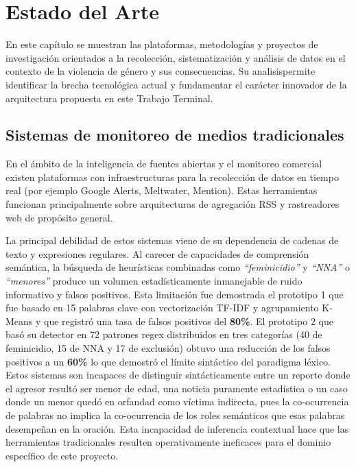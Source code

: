 

\chapter{Estado del Arte}
\label{cap:estadoarte}

En este capítulo se muestran las plataformas, metodologías y proyectos de investigación orientados a la recolección,
sistematización y análisis de datos en el contexto de la violencia de género y sus consecuencias. Su analisispermite identificar la
brecha tecnológica actual y fundamentar el carácter innovador de la arquitectura propuesta en este Trabajo Terminal.
 
\section{Sistemas de monitoreo de medios tradicionales}
\label{sec:ea_monitoreo_tradicional}

En el ámbito de la inteligencia de fuentes abiertas y el monitoreo comercial
existen plataformas con infraestructuras para la recolección de datos en tiempo real (por ejemplo
Google Alerts, Meltwater, Mention). Estas herramientas funcionan principalmente sobre arquitecturas
de agregación RSS y rastreadores web de propósito general.

La principal debilidad de estos sistemas viene de su dependencia de cadenas de texto
y expresiones regulares. Al carecer de capacidades de comprensión semántica, la búsqueda de
heurísticas combinadas como \textit{``feminicidio''} y \textit{``NNA''} o \textit{``menores''} produce un volumen
estadísticamente inmanejable de ruido informativo y falsos positivos. Esta limitación fue demostrada
el prototipo 1 que fue basado en 15 palabras clave  con vectorización TF-IDF
y agrupamiento K-Means y que registró una tasa de falsos positivos del \textbf{80\%}. El prototipo 2 que
basó su detector en 72 patrones regex distribuidos en tres categorías (40 de feminicidio, 15 de NNA
y 17 de exclusión) obtuvo una reducción de los falsos positivos a un \textbf{60\%} lo que
demostró el límite sintáctico del paradigma léxico. Estos sistemas son incapaces de distinguir sintácticamente
entre un reporte donde el agresor resultó ser menor de edad, una noticia puramente estadística o un
caso donde un menor quedó en orfandad como víctima indirecta, pues la co-ocurrencia de palabras no
implica la co-ocurrencia de los roles semánticos que esas palabras desempeñan en la oración. Esta
incapacidad de inferencia contextual hace que las herramientas tradicionales resulten operativamente
ineficaces para el dominio específico de este proyecto.

